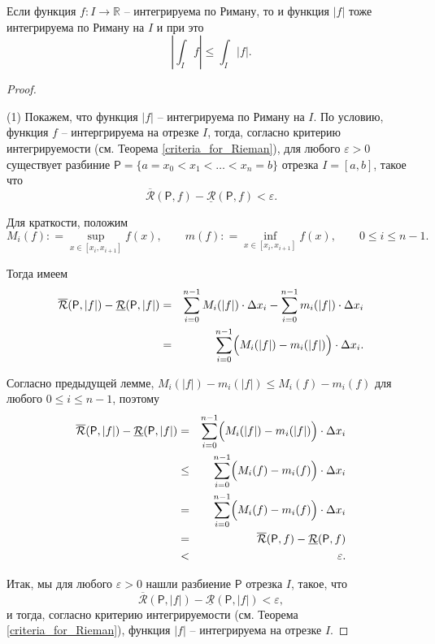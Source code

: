 \begin{corollary}\label{int|f|}
    Если функция $f:I \to \mathbb{R}$ -- интегрируема по Риману, то и функция $|f|$ тоже интегрируема по Риману на $I$ и при это
    \[
     \left| \int_I f \right| \le \int_I |f|.
    \]
\end{corollary}

\begin{proof}~

(1) Покажем, что функция $|f|$ -- интегрируема по Риману на $I$. По условию, функция $f$ -- интергрируема на отрезке $I$, тогда, согласно критерию интегрируемости (см. Теорема \ref{criteria_for_Rieman}), для любого $\varepsilon>0$ существует разбиние $\mathsf{P} = \{a=x_0 < x_1 < \ldots < x_n = b\}$ отрезка $I = [a,b]$, такое что
\[
 \overline{\mathcal{R}}(\mathsf{P},f) - \underline{\mathcal{R}}(\mathsf{P}, f) < \varepsilon.
\]

Для краткости, положим 
\[
 M_i(f): = \sup_{x\in [x_i,x_{i+1}]} f(x), \qquad m(f): = \inf_{x\in [x_i, x_{i+1}]}f(x), \qquad 0 \le i \le n-1.
\]

Тогда имеем
\begin{eqnarray*}
    \overline{\mathcal{R}}(\mathsf{P},|f|) - \underline{\mathcal{R}}(\mathsf{P}, |f|) &=& \sum_{i=0}^{n-1} M_i(|f|)\cdot \Delta x_i - \sum_{i=0}^{n-1} m_i(|f|) \cdot \Delta x_i \\
    &=& \sum_{i=0}^{n-1} \Bigl(M_i(|f|) - m_i(|f|)\Bigr)\cdot \Delta x_i.
\end{eqnarray*}

 Согласно предыдущей лемме, $M_i(|f|) - m_i(|f|) \le M_i(f) - m_i(f)$ для любого $0 \le i \le n-1$, поэтому  
\begin{eqnarray*}
   \overline{\mathcal{R}}(\mathsf{P},|f|) - \underline{\mathcal{R}}(\mathsf{P}, |f|) &=& \sum_{i=0}^{n-1} \Bigl(M_i(|f|) - m_i(|f|)\Bigr)\cdot \Delta x_i \\
   &\le & \sum_{i=0}^{n-1} \Bigl(M_i(f) - m_i(f)\Bigr)\cdot \Delta x_i\\
   &=&\sum_{i=0}^{n-1} \Bigl(M_i(f) - m_i(f)\Bigr)\cdot \Delta x_i \\
   &=& \overline{\mathcal{R}}(\mathsf{P},f) - \underline{\mathcal{R}}(\mathsf{P}, f)\\
   &<& \varepsilon.
\end{eqnarray*}

Итак, мы для любого $\varepsilon>0$ нашли разбиение $\mathsf{P}$ отрезка $I$, такое, что
\[
 \overline{\mathcal{R}}(\mathsf{P},|f|) - \underline{\mathcal{R}}(\mathsf{P}, |f|) < \varepsilon,
\]
и тогда, согласно критерию интегрируемости (см. Теорема \ref{criteria_for_Rieman}), функция $|f|$ -- интегрируема на отрезке $I.$


\end{proof}
